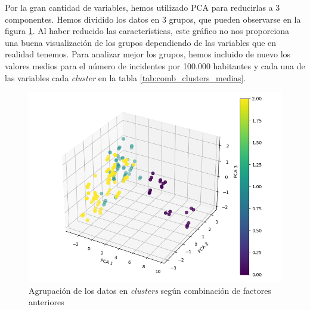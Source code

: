 \documentclass[11pt,a4paper]{article}
\begin{document}
Por la gran cantidad de variables, hemos utilizado PCA para reducirlas a 3 componentes. Hemos dividido los datos en 3 grupos, que pueden observarse en la figura \ref{fig:comb_clusters}. Al haber reducido las características, este gráfico no nos proporciona una buena visualización de los grupos dependiendo de las variables que en realidad tenemos. Para analizar mejor los grupos, hemos incluido de nuevo los valores medios para el número de incidentes por 100.000 habitantes y cada una de las variables cada \textit{cluster} en la tabla \ref{tab:comb_clusters_medias}.

\begin{figure}[H]
    \centering
    \includegraphics[width=.8\linewidth]{combined_clusters.png}
    \caption{Agrupación de los datos en \textit{clusters} según combinación de factores anteriores}
    \label{fig:comb_clusters}
\end{figure}

\begin{table}[H]
    \centering
{}
    \caption{Valores medios de las variables para cada \textit{cluster} según combinación de factores anteriores (puede verse con un mejor tamaño en los \textit{notebooks})}
    \label{tab:comb_clusters_medias}
\end{table}
\end{document}
